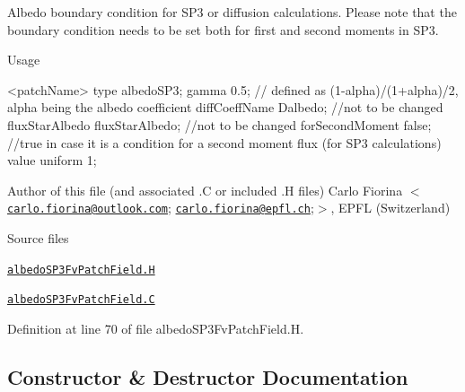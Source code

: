 Albedo boundary condition for S\+P3 or diffusion calculations. Please note that the boundary condition needs to be set both for first and second moments in S\+P3. 

\label{_Description}%
 \begin{DoxyParagraph}{Usage}
\begin{DoxyVerb}<patchName>
{
    type            albedoSP3;
    gamma           0.5; // defined as (1-alpha)/(1+alpha)/2, alpha being the albedo coefficient
    diffCoeffName   Dalbedo;  //not to be changed
    fluxStarAlbedo  fluxStarAlbedo; //not to be changed
    forSecondMoment false;  //true in case it is a condition for a second moment flux (for SP3 calculations)
    value           uniform 1;
}
\end{DoxyVerb}

\end{DoxyParagraph}
Author of this file (and associated .C or included .H files) Carlo Fiorina $<$\href{mailto:carlo.fiorina@outlook.com}{\tt carlo.\+fiorina@outlook.\+com}; \href{mailto:carlo.fiorina@epfl.ch}{\tt carlo.\+fiorina@epfl.\+ch};$>$, E\+P\+FL (Switzerland)

\begin{DoxyParagraph}{Source files}

\begin{DoxyItemize}
\item \href{../../../home/carlo/data/GeN-Foam/GeN-Foam_ffn/GeN-Foam/GeN-Foam/classes/neutronics/albedoSP3/albedoSP3FvPatchField.H}{\tt albedo\+S\+P3\+Fv\+Patch\+Field.\+H} 
\item \href{../../../home/carlo/data/GeN-Foam/GeN-Foam_ffn/GeN-Foam/GeN-Foam/classes/neutronics/albedoSP3/albedoSP3FvPatchField.C}{\tt albedo\+S\+P3\+Fv\+Patch\+Field.\+C} 
\end{DoxyItemize}
\end{DoxyParagraph}


Definition at line 70 of file albedo\+S\+P3\+Fv\+Patch\+Field.\+H.



\subsection{Constructor \& Destructor Documentation}
\mbox{\label{classFoam_1_1albedoSP3FvPatchField_a67f6c1e24d954013a2acaf06b6198ebb}} 
